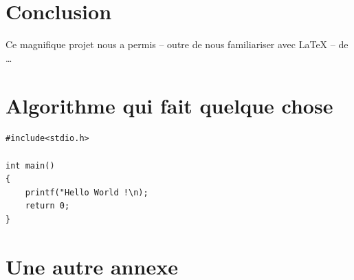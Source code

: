 \documentclass[a4paper, 12pt]{article}
\begin{document}
\clearpage 
\section*{Conclusion}

Ce magnifique projet nous a permis -- outre de nous familiariser avec \LaTeX{} -- de \ldots

\clearpage 




\clearpage 
\appendix
\bigskip{}
\section{Algorithme qui fait quelque chose}
\begin{verbatim}
#include<stdio.h>

int main()
{
	printf("Hello World !\n);
	return 0;
}
\end{verbatim}

\clearpage 
\section{Une autre annexe}
\end{document}
